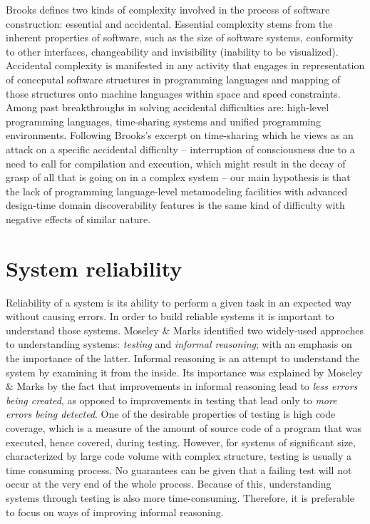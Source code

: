 \n

Brooks \cite{brooks} defines two kinds of complexity involved in the process of software construction: essential and accidental.
Essential complexity stems from the inherent properties of software, such as the size of software systems, conformity to other interfaces, changeability and invisibility (inability to be visualized).
Accidental complexity is manifested in any activity that engages in representation of conceputal software structures in programming languages and mapping of those structures onto machine languages within space and speed constraints.
Among past breakthroughs in solving accidental difficulties are: high-level programming languages, time-sharing systems and unified programming environments.
Following Brooks’s excerpt on time-sharing which he views as an attack on a specific accidental difficulty -- interruption of consciousness due to a need to call for compilation and execution, which might result in the decay of grasp of all that is going on in a complex system -- our main hypothesis is that the lack of programming language-level metamodeling facilities with advanced design-time domain discoverability features is the same kind of difficulty with negative effects of similar nature.

\section{System reliability}
Reliability of a system is its ability to perform a given task in an expected way without causing errors.
In order to build reliable systems it is important to understand those systems.
Moseley \& Marks \cite{moseley} identified two widely-used approches to understanding systems: \textit{testing} and \textit{informal reasoning}; with an emphasis on the importance of the latter.
Informal reasoning is an attempt to understand the system by examining it from the inside.
Its importance was explained by Moseley \& Marks by the fact that improvements in informal reasoning lead to \textit{less errors being created}, as opposed to improvements in testing that lead only to \textit{more errors being detected}.
One of the desirable properties of testing is high code coverage, which is a measure of the amount of source code of a program that was executed, hence covered, during testing.
However, for systems of significant size, characterized by large code volume with complex structure, testing is usually a time consuming process.
No guarantees can be given that a failing test will not occur at the very end of the whole process.
Because of this, understanding systems through testing is also more time-consuming.
Therefore, it is preferable to focus on ways of improving informal reasoning.

